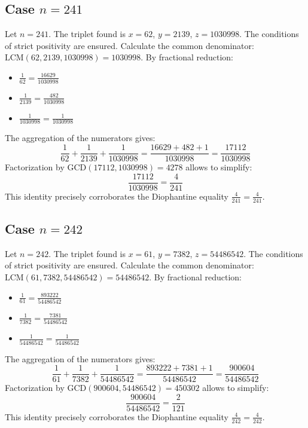 \documentclass[11pt,a4paper]{article}
\begin{document}
\subsection{Case $n = 241$}
Let $n = 241$. The triplet found is $x = 62$, $y = 2139$, $z = 1030998$.
The conditions of strict positivity are ensured.
Calculate the common denominator: $\text{LCM}(62, 2139, 1030998) = 1030998$.
By fractional reduction:
\begin{itemize}
    \item $\frac{1}{62} = \frac{16629}{1030998}$
    \item $\frac{1}{2139} = \frac{482}{1030998}$
    \item $\frac{1}{1030998} = \frac{1}{1030998}$
\end{itemize}
The aggregation of the numerators gives:
$$ \frac{1}{62} + \frac{1}{2139} + \frac{1}{1030998} = \frac{16629 + 482 + 1}{1030998} = \frac{17112}{1030998} $$
Factorization by $\text{GCD}(17112, 1030998) = 4278$ allows to simplify:
$$ \frac{17112}{1030998} = \frac{4}{241} $$
This identity precisely corroborates the Diophantine equality $\frac{4}{241} = \frac{4}{241}$.

\subsection{Case $n = 242$}
Let $n = 242$. The triplet found is $x = 61$, $y = 7382$, $z = 54486542$.
The conditions of strict positivity are ensured.
Calculate the common denominator: $\text{LCM}(61, 7382, 54486542) = 54486542$.
By fractional reduction:
\begin{itemize}
    \item $\frac{1}{61} = \frac{893222}{54486542}$
    \item $\frac{1}{7382} = \frac{7381}{54486542}$
    \item $\frac{1}{54486542} = \frac{1}{54486542}$
\end{itemize}
The aggregation of the numerators gives:
$$ \frac{1}{61} + \frac{1}{7382} + \frac{1}{54486542} = \frac{893222 + 7381 + 1}{54486542} = \frac{900604}{54486542} $$
Factorization by $\text{GCD}(900604, 54486542) = 450302$ allows to simplify:
$$ \frac{900604}{54486542} = \frac{2}{121} $$
This identity precisely corroborates the Diophantine equality $\frac{4}{242} = \frac{4}{242}$.
\end{document}
